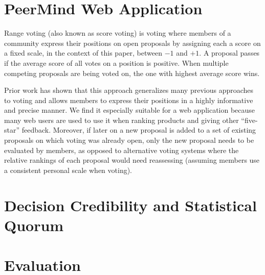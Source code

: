 \documentclass[chi_draft]{sigchi}
\begin{document}




\section{PeerMind Web Application}
\label{sec:peermind}

Range voting (also known as score voting) is voting where members of a community express their positions on open proposals by assigning
each a score on a fixed scale, in the context of this paper, between $-1$ and $+1$.
A proposal passes if the average score of all votes on a position is positive.
When multiple competing proposals are being voted on, the one with highest average score wins.

Prior work has shown that this approach generalizes many previous approaches to voting and allows members to express their
positions in a highly informative and precise manner.
We find it especially suitable for a web application because many web users are used to use it when ranking products
and giving other ``five-star'' feedback.
Moreover, if later on a new proposal is added to a set of existing proposals on which voting was already open, only the
new proposal needs to be evaluated by members, as opposed to alternative voting systems where the relative rankings of
each proposal would need reassessing (assuming members use a consistent personal scale when voting).

\section{Decision Credibility and Statistical Quorum}
\label{sec:statistical-quorum}

\section{Evaluation}
\label{sec:evaluation}
\end{document}
